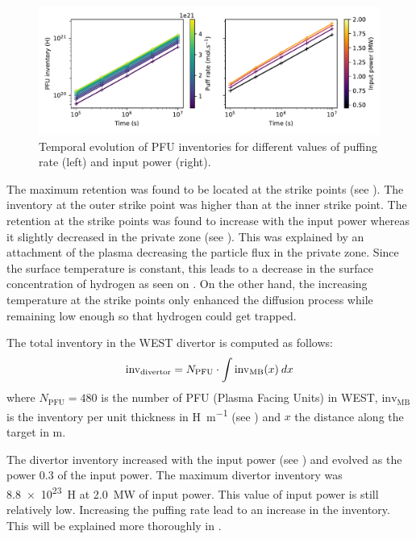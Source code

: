 \begin{figure}[h]
    \centering
    \includegraphics[width=\linewidth]{Figures/Chapter4/WEST/inventory_vs_time_west.pdf}
    \caption{Temporal evolution of PFU inventories for different values of puffing rate (left) and input power (right).}
\end{figure}

The maximum retention was found to be located at the strike points (see ).
The inventory at the outer strike point was higher than at the inner strike point.
The retention at the strike points was found to increase with the input power whereas it slightly decreased in the private zone (see ).
This was explained by an attachment of the plasma decreasing the particle flux in the private zone.
Since the surface temperature is constant, this leads to a decrease in the surface concentration of hydrogen as seen on .
On the other hand, the increasing temperature at the strike points only enhanced the diffusion process while remaining low enough so that hydrogen could get trapped.

The total inventory in the WEST divertor is computed as follows:
\begin{equation}
    \mathrm{inv}_\mathrm{divertor} = N_\mathrm{PFU} \cdot \int \mathrm{inv}_\mathrm{MB}(x)\: dx
    \labeq{inventory WEST}
\end{equation}
where $N_\mathrm{PFU} = 480$ is the number of PFU (Plasma Facing Units) in WEST, $\mathrm{inv}_\mathrm{MB}$ is the inventory per unit thickness in \si{H.m^{-1}} (see ) and $x$ the distance along the target in \si{m}.

The divertor inventory increased with the input power (see ) and evolved as the power 0.3 of the input power.
The maximum divertor inventory was \SI{8.8e23}{H} at \SI{2.0}{MW} of input power.
This value of input power is still relatively low.
Increasing the puffing rate lead to an increase in the inventory.
This will be explained more thoroughly in .

